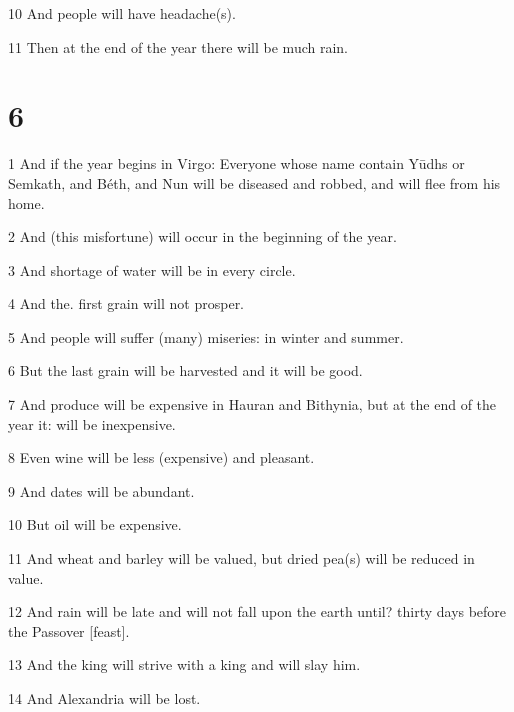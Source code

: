 \par 10 And people will have headache(s). 

\par 11 Then at the end of the year there will be much rain. 


\chapter{6}

\par 1 And if the year begins in Virgo: Everyone whose name contain Yūdhs or Semkath, and Béth, and Nun will be diseased and robbed, and will flee from his home. 

\par 2 And (this misfortune) will occur in the beginning of the year. 

\par 3 And shortage of water will be in every circle. 

\par 4 And the. first grain will not prosper. 

\par 5 And people will suffer (many) miseries: in winter and summer. 

\par 6 But the last grain will be harvested and it will be good. 

\par 7 And produce will be expensive in Hauran and Bithynia, but at the end of the year it: will be inexpensive. 

\par 8 Even wine will be less (expensive) and pleasant. 

\par 9 And dates will be abundant. 

\par 10 But oil will be expensive. 

\par 11 And wheat and barley will be valued, but dried pea(s) will be reduced in value. 

\par 12 And rain will be late and will not fall upon the earth until? thirty days before the Passover [feast].

\par 13 And the king will strive with a king and will slay him. 

\par 14 And Alexandria will be lost. 

